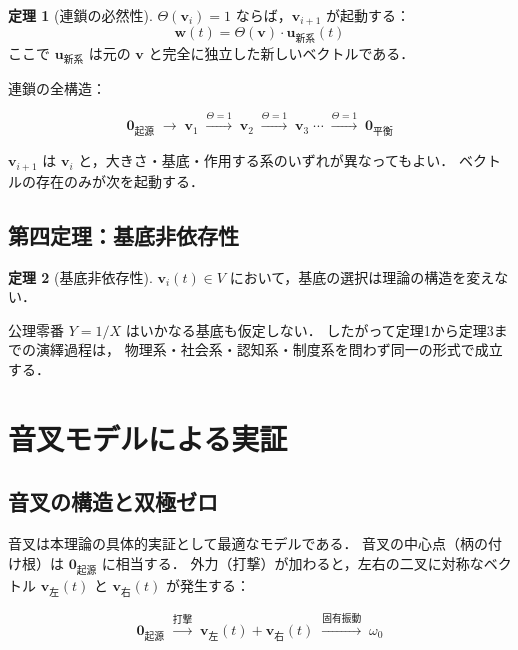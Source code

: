 \documentclass[12pt, a4paper]{article}
\theoremstyle{definition}
\newtheorem{theorem}{定理}
\newcommand{\vorigin}{\mathbf{0}_{\text{起源}}}
\newcommand{\vequil}{\mathbf{0}_{\text{平衡}}}
\newcommand{\Switch}{\Theta}
\begin{document}
\begin{theorem}[連鎖の必然性]
  $\Switch(\mathbf{v}_i) = 1$ ならば，$\mathbf{v}_{i+1}$ が起動する：
  \begin{equation}
    \mathbf{w}(t) = \Switch(\mathbf{v}) \cdot \mathbf{u}_{\text{新系}}(t)
    \label{eq:chain}
  \end{equation}
  ここで $\mathbf{u}_{\text{新系}}$ は元の $\mathbf{v}$ と完全に独立した新しいベクトルである．
\end{theorem}

連鎖の全構造：

\begin{equation}
  \vorigin \;\to\; \mathbf{v}_1
  \;\xrightarrow{\Switch=1}\; \mathbf{v}_2
  \;\xrightarrow{\Switch=1}\; \mathbf{v}_3
  \;\cdots
  \;\xrightarrow{\Switch=1}\; \vequil
  \label{eq:chain_full}
\end{equation}

$\mathbf{v}_{i+1}$ は $\mathbf{v}_i$ と，大きさ・基底・作用する系のいずれが異なってもよい．
ベクトルの存在のみが次を起動する．

\subsection{第四定理：基底非依存性}

\begin{theorem}[基底非依存性]
  $\mathbf{v}_i(t) \in V$ において，基底の選択は理論の構造を変えない．
\end{theorem}

公理零番 $Y = 1/X$ はいかなる基底も仮定しない．
したがって定理1から定理3までの演繹過程は，
物理系・社会系・認知系・制度系を問わず同一の形式で成立する．

\section{音叉モデルによる実証}

\subsection{音叉の構造と双極ゼロ}

音叉は本理論の具体的実証として最適なモデルである．
音叉の中心点（柄の付け根）は $\vorigin$ に相当する．
外力（打撃）が加わると，左右の二叉に対称なベクトル
$\mathbf{v}_{\text{左}}(t)$ と $\mathbf{v}_{\text{右}}(t)$ が発生する：

\begin{equation}
  \vorigin
  \;\xrightarrow{\text{打撃}}\;
  \mathbf{v}_{\text{左}}(t) + \mathbf{v}_{\text{右}}(t)
  \;\xrightarrow{\text{固有振動}}\;
  \omega_0
\end{equation}
\end{document}
